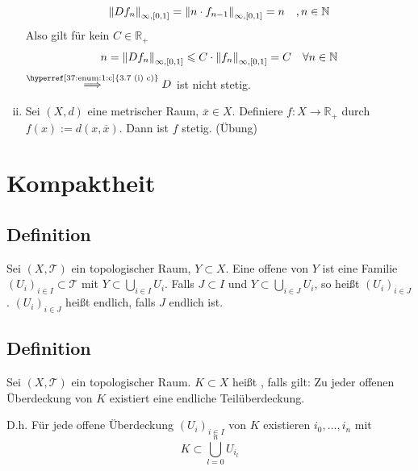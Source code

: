 \begin{enumerate}[(i)]
	\[
		\norm[{\infty,[0,1]}]{D f_n} = \norm[{\infty, [0,1]}]{n \cdot f_{n-1}} = n  \quad , n \in \mathds{N}  
	\]
	Also gilt für kein $C \in \mathds{R}_+$
	\begin{align*}
		n = \norm[{\infty, [0,1]}]{D f_n} \le C \cdot \norm[{\infty, [0,1]}]{f_n} = C \quad \forall n \in \mathds{N} 
	\end{align*}
	$\stackrel{\text{\hyperref[37:enum:1:c]{3.7 (i) c)}}}{\Longrightarrow} D$ ist nicht stetig. 
	\item Sei $(X,d)$ eine metrischer Raum, $\overline{x} \in X$. Definiere $f : X \to \mathds{R}_+$ durch $f(x):= d(x, \overline{x})$. Dann ist $f$ stetig. \hfill (Übung)
 \end{enumerate}


\newpage
\section{Kompaktheit} %
\label{sec:4}

\subsection[Definition Überdeckung]{Definition} %
\label{sub:41}
Sei $(X, \mathcal{T})$ ein topologischer Raum, $Y \subset X$. Eine offene  von $Y$ ist eine Familie $(U_i)_{i \in I} \subset \mathcal{T}$ mit 
$Y \subset \bigcup_{i \in I} U_i$. Falls $J \subset I$ und $Y \subset \bigcup_{i \in J} U_i$, so heißt $(U_i)_{i \in J}$ . $(U_i)_{i \in J}$ heißt
endlich, falls $J$ endlich ist. 

\subsection[Definition Kompaktheit]{Definition} %
\label{sub:42}
Sei $(X,\mathcal{T})$ ein topologischer Raum. $K \subset X$ heißt , falls gilt: Zu jeder offenen Überdeckung von $K$ existiert eine endliche 
Teilüberdeckung. 

D.h. Für jede offene Überdeckung $(U_i)_{i \in I}$ von $K$ existieren $i_0, \ldots , i_n$ mit 
\[
	K \subset \bigcup_{l=0}^{n} U_{i_l}
\]

